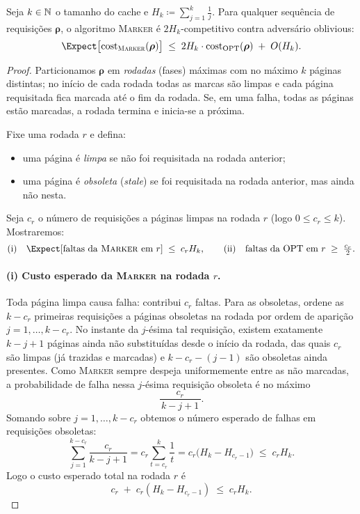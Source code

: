 \begin{theorem}
Seja $k \in \mathbb{N}$ o tamanho do cache e $H_k \coloneqq \sum_{j=1}^k \tfrac1j$.
Para qualquer sequência de requisições $\boldsymbol{\rho}$, o algoritmo \textsc{Marker} é
$2H_k$-competitivo contra adversário oblivious:
\begin{equation*}
\Expect\big[\mathrm{cost}_{\textsc{Marker}}(\boldsymbol{\rho})\big]
\;\le\; 2H_k \cdot \mathrm{cost}_{\mathrm{OPT}}(\boldsymbol{\rho}) \;+\; O(H_k).
\end{equation*}

\begin{proof}
Particionamos $\boldsymbol{\rho}$ em \emph{rodadas} (fases) máximas com no máximo $k$ páginas distintas;
no início de cada rodada todas as marcas são limpas e cada página requisitada fica marcada
até o fim da rodada. Se, em uma falha, todas as páginas estão marcadas, a rodada termina
e inicia-se a próxima.

Fixe uma rodada $r$ e defina:
\begin{itemize}
\item uma página é \emph{limpa} se não foi requisitada na rodada anterior;
\item uma página é \emph{obsoleta} (\emph{stale}) se foi requisitada na rodada anterior, mas ainda não nesta.
\end{itemize}
Seja $c_r$ o número de requisições a páginas limpas na rodada $r$ (logo $0\le c_r\le k$).
Mostraremos:
\begin{equation*}
\mathrm{(i)}\quad \Expect[\text{faltas da \textsc{Marker} em $r$}] \;\le\; c_r H_k,
\qquad
\mathrm{(ii)}\quad \text{faltas da OPT em $r$} \;\ge\; \tfrac{c_r}{2}.
\end{equation*}

\paragraph{(i) Custo esperado da \textsc{Marker} na rodada $r$.}
Toda página limpa causa falha: contribui $c_r$ faltas.
Para as obsoletas, ordene as $k-c_r$ primeiras requisições a páginas obsoletas na rodada por ordem de aparição $j=1,\dots,k-c_r$.
No instante da $j$-ésima tal requisição, existem exatamente $k-j+1$ páginas ainda não substituídas desde o início da rodada,
das quais $c_r$ são limpas (já trazidas e marcadas) e $k-c_r-(j-1)$ são obsoletas ainda presentes.
Como \textsc{Marker} sempre despeja uniformemente entre as não marcadas, a probabilidade de falha nessa $j$-ésima requisição
obsoleta é no máximo
\[
\frac{c_r}{\,k-j+1\,}.
\]
Somando sobre $j=1,\dots,k-c_r$ obtemos o número esperado de falhas em requisições obsoletas:
\[
\sum_{j=1}^{k-c_r} \frac{c_r}{k-j+1}
= c_r \!\!\sum_{t=c_r}^{k} \frac{1}{t}
= c_r\big(H_k - H_{c_r-1}\big)
\;\le\; c_r H_k.
\]
Logo o custo esperado total na rodada $r$ é
\[
c_r \;+\; c_r(H_k - H_{c_r-1}) \;\le\; c_r H_k.
\]


\end{proof}
\end{theorem}
